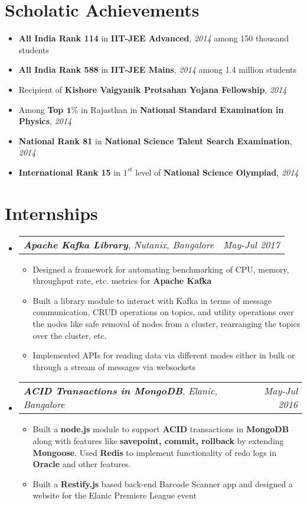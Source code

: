 \documentclass[letterpaper,11pt]{article}
\makeatletter
\newcommand{\resumeItemS}[1]{
  \item\small{
    {#1 \vspace{-4pt}}
  }
}
\newcommand{\resumeSubheadingS}[3]{
  \item
    \begin{tabularx}{0.97\textwidth}{l@{\extracolsep{\fill}}r}
      \small{\textbf{\textit{#1}}}, \small{\textit{#2}} & \small{\textit{#3}} \\ 
    \end{tabularx}\vspace{-7pt}
}
\newcommand{\resumeSubItemS}[1]{\resumeItemS{#1}\vspace{-0.8pt}}
\newcommand{\resumeSubHeadingListStart}{\begin{itemize}[leftmargin=*]}
\newcommand{\resumeSubHeadingListEnd}{\end{itemize}}
\newcommand{\resumeItemListStart}{\begin{itemize}[leftmargin=*]}
\newcommand{\resumeItemListEnd}{\end{itemize}\vspace{-3pt}}
\makeatother
\begin{document}
\section{Scholatic Achievements}
  \resumeSubHeadingListStart
    \resumeSubItemS
      {\textbf{All India Rank 114} in \textbf{IIT-JEE Advanced}, \textit{2014} among 150 thousand students}
    \resumeSubItemS
      {\textbf{All India Rank 588} in \textbf{IIT-JEE Mains}, \textit{2014} among 1.4 million students}
    \resumeSubItemS
      {Recipient of \textbf{Kishore Vaigyanik Protsahan Yojana Fellowship}, \textit{2014}}
    \resumeSubItemS
      {Among \textbf{Top $\textbf{1}\%$} in Rajasthan in \textbf{National Standard Examination in Physics}, \textit{2014}}
    \resumeItemS
      {\textbf{National Rank 81} in \textbf{National Science Talent Search Examination}, \textit{2014}}
    \resumeSubItemS
      {\textbf{International Rank 15} in $1^{st}$ level of \textbf{National Science Olympiad}, \textit{2014}}
  \resumeSubHeadingListEnd
  \vspace{-11pt}


\section{Internships}
  \resumeSubHeadingListStart
    \vspace{-1pt}
    \resumeSubheadingS
      {Apache Kafka Library}{Nutanix, Bangalore}
      {May-Jul 2017}
      \resumeItemListStart
        \resumeItemS
          {Designed a framework for automating benchmarking of CPU, memory, throughput rate, etc. metrics for \textbf{Apache Kafka}\vspace{-11pt}}
        \resumeItemS
          {Built a library module to interact with Kafka in terms of message communication, CRUD operations on topics, and utility operations over the nodes like safe removal of nodes from a cluster, rearranging the topics over the cluster, etc.}
        \resumeItemS
          {Implemented APIs for reading data via different modes either in bulk or through a stream of messages via websockets}  
      \resumeItemListEnd
    
    \resumeSubheadingS
      {ACID Transactions in MongoDB}{Elanic, Bangalore}
      {May-Jul 2016}
      \resumeItemListStart
        \resumeItemS
          {Built a \textbf{node.js} module to support \textbf{ACID} transactions in \textbf{MongoDB} along with features like \textbf{savepoint, commit, rollback} by extending \textbf{Mongoose}. Used \textbf{Redis} to implement functionality of redo logs in \textbf{Oracle} and other features.}
        \resumeItemS
          {Built a \textbf{Restify.js} based back-end Barcode Scanner app and designed a website for the Elanic Premiere League event}
      \resumeItemListEnd
  \resumeSubHeadingListEnd
  \vspace{-13pt}
\end{document}
